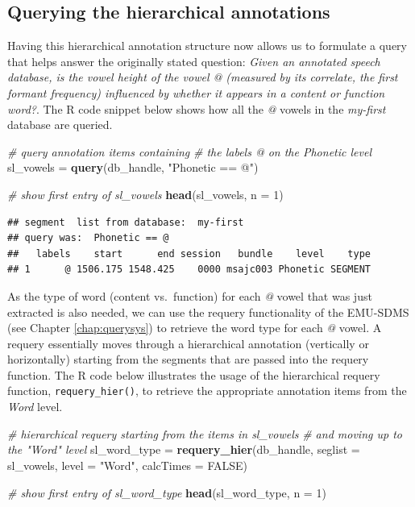 \documentclass[]{book}
\newenvironment{Shaded}{\begin{snugshade}}{\end{snugshade}}
\newcommand{\CommentTok}[1]{\textcolor[rgb]{0.56,0.35,0.01}{\textit{#1}}}
\newcommand{\DataTypeTok}[1]{\textcolor[rgb]{0.13,0.29,0.53}{#1}}
\newcommand{\DecValTok}[1]{\textcolor[rgb]{0.00,0.00,0.81}{#1}}
\newcommand{\KeywordTok}[1]{\textcolor[rgb]{0.13,0.29,0.53}{\textbf{#1}}}
\newcommand{\NormalTok}[1]{#1}
\newcommand{\OtherTok}[1]{\textcolor[rgb]{0.56,0.35,0.01}{#1}}
\newcommand{\StringTok}[1]{\textcolor[rgb]{0.31,0.60,0.02}{#1}}
\theoremstyle{definition}
\theoremstyle{definition}
\theoremstyle{definition}
\theoremstyle{remark}
\begin{document}
\hypertarget{querying-the-hierarchical-annotations}{%
\subsection{Querying the hierarchical
annotations}\label{querying-the-hierarchical-annotations}}

Having this hierarchical annotation structure now allows us to formulate
a query that helps answer the originally stated question: \emph{Given an
annotated speech database, is the vowel height of the vowel @ (measured
by its correlate, the first formant frequency) influenced by whether it
appears in a content or function word?}. The R code snippet below shows
how all the \emph{@} vowels in the \emph{my-first} database are queried.

\begin{Shaded}
\begin{Highlighting}[]
\CommentTok{# query annotation items containing}
\CommentTok{# the labels @ on the Phonetic level}
\NormalTok{sl_vowels =}\StringTok{ }\KeywordTok{query}\NormalTok{(db_handle, }\StringTok{"Phonetic == @"}\NormalTok{)}

\CommentTok{# show first entry of sl_vowels}
\KeywordTok{head}\NormalTok{(sl_vowels, }\DataTypeTok{n =} \DecValTok{1}\NormalTok{)}
\end{Highlighting}
\end{Shaded}

\begin{verbatim}
## segment  list from database:  my-first 
## query was:  Phonetic == @ 
##   labels    start      end session   bundle    level    type
## 1      @ 1506.175 1548.425    0000 msajc003 Phonetic SEGMENT
\end{verbatim}

As the type of word (content vs.~function) for each \emph{@} vowel that
was just extracted is also needed, we can use the requery functionality
of the EMU-SDMS (see Chapter \ref{chap:querysys}) to retrieve the word
type for each \emph{@} vowel. A requery essentially moves through a
hierarchical annotation (vertically or horizontally) starting from the
segments that are passed into the requery function. The R code below
illustrates the usage of the hierarchical requery function,
\texttt{requery\_hier()}, to retrieve the appropriate annotation items
from the \emph{Word} level.

\begin{Shaded}
\begin{Highlighting}[]
\CommentTok{# hierarchical requery starting from the items in sl_vowels}
\CommentTok{# and moving up to the "Word" level}
\NormalTok{sl_word_type =}\StringTok{ }\KeywordTok{requery_hier}\NormalTok{(db_handle,}
                           \DataTypeTok{seglist =}\NormalTok{ sl_vowels,}
                           \DataTypeTok{level =} \StringTok{"Word"}\NormalTok{,}
                           \DataTypeTok{calcTimes =} \OtherTok{FALSE}\NormalTok{)}

\CommentTok{# show first entry of sl_word_type}
\KeywordTok{head}\NormalTok{(sl_word_type, }\DataTypeTok{n =} \DecValTok{1}\NormalTok{)}
\end{Highlighting}
\end{Shaded}
\end{document}
